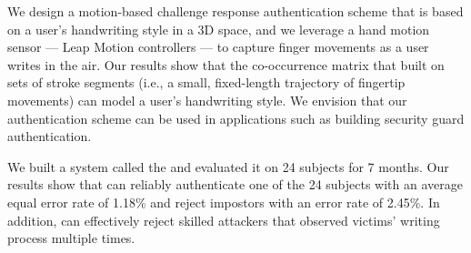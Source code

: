 We design a motion-based challenge response authentication scheme that is based on a user's handwriting style in a 3D space, and we leverage a hand motion sensor --- Leap Motion controllers --- to capture finger movements as a user writes in the air.  Our results show that the co-occurrence matrix that built on sets of stroke segments (i.e., a small, fixed-length trajectory of fingertip movements) can model a user's handwriting style. We envision that our authentication scheme can be used in applications such as building security guard authentication. 

We built a system called the \CiT and evaluated it on 24 subjects for 7 months.  
Our results show that \CiT can reliably authenticate one of the 24 subjects with an average equal error rate of 1.18\% and reject impostors with an error rate of 2.45\%. In addition, \CiT can effectively reject skilled attackers that observed victims' writing process multiple times. %







